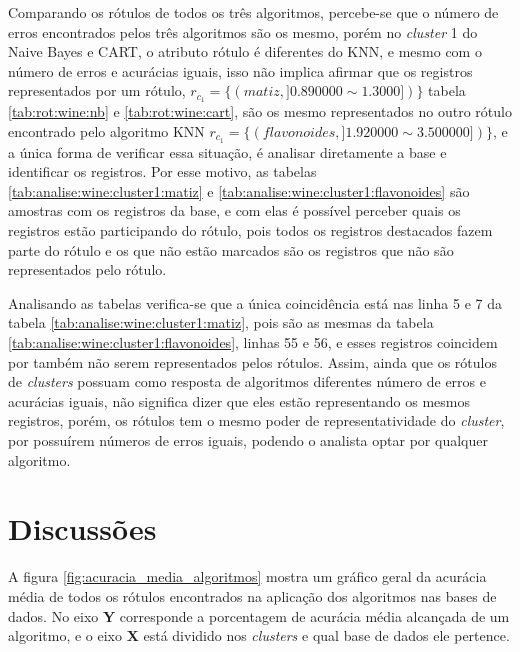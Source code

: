 Comparando os rótulos de todos os três algoritmos, percebe-se que o número de erros encontrados pelos três algoritmos são os mesmo, porém no \textit{cluster} 1 do Naive Bayes e CART, o atributo rótulo é diferentes do KNN, e mesmo com o número de erros e acurácias iguais, isso não implica afirmar que os registros representados por um rótulo,  ${r_{c_1}=\{ (matiz, ] 0.890000 \sim  1.3000])\} }$ tabela \ref{tab:rot:wine:nb} e \ref{tab:rot:wine:cart}, são os mesmo representados no outro rótulo encontrado pelo algoritmo KNN ${r_{c_1}=\{ (flavonoides, ] 1.920000 \sim  3.500000])\} }$, e a única forma de verificar essa situação, é analisar diretamente a base e identificar os registros. Por esse motivo, as tabelas  \ref{tab:analise:wine:cluster1:matiz} e \ref{tab:analise:wine:cluster1:flavonoides} são amostras com os registros da base, e com elas é possível perceber quais os registros estão participando do rótulo, pois todos os registros destacados fazem parte do rótulo e os que não estão marcados são os registros que não são representados pelo rótulo. 

Analisando as tabelas verifica-se que a única coincidência está nas linha 5 e 7 da tabela \ref{tab:analise:wine:cluster1:matiz}, pois são as mesmas da tabela \ref{tab:analise:wine:cluster1:flavonoides}, linhas 55 e 56, e esses registros coincidem por também não serem representados pelos rótulos. Assim, ainda que os rótulos de \textit{clusters} possuam como resposta de algoritmos diferentes número de erros e acurácias iguais, não significa dizer que eles estão representando os mesmos registros, porém, os rótulos tem o mesmo poder de representatividade do \textit{cluster}, por possuírem números de erros iguais, podendo o analista optar por qualquer algoritmo.



\section{Discussões}

A figura \ref{fig:acuracia_media_algoritmos} mostra um gráfico geral da acurácia média de todos os rótulos encontrados na aplicação dos algoritmos nas bases de dados. No eixo \textbf{Y} corresponde a porcentagem de acurácia média alcançada de um algoritmo, e o eixo \textbf{X} está dividido nos \textit{clusters} e qual base de dados ele pertence.

